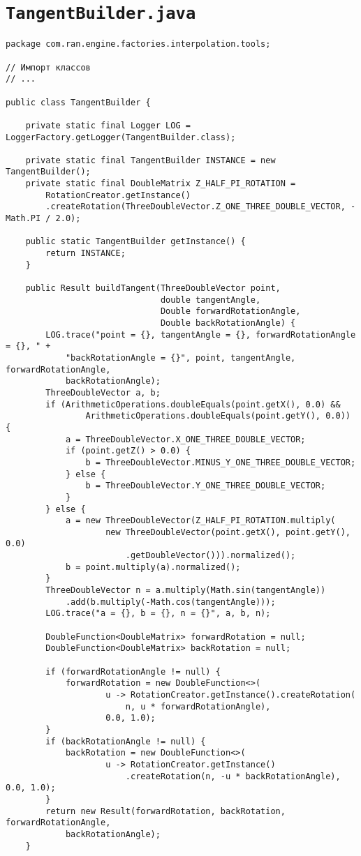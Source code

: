 \section*{\texttt{TangentBuilder.java}}
\begin{verbatim}
package com.ran.engine.factories.interpolation.tools;

// Импорт классов
// ...

public class TangentBuilder {

    private static final Logger LOG = LoggerFactory.getLogger(TangentBuilder.class);

    private static final TangentBuilder INSTANCE = new TangentBuilder();
    private static final DoubleMatrix Z_HALF_PI_ROTATION =
        RotationCreator.getInstance()
        .createRotation(ThreeDoubleVector.Z_ONE_THREE_DOUBLE_VECTOR, -Math.PI / 2.0);

    public static TangentBuilder getInstance() {
        return INSTANCE;
    }

    public Result buildTangent(ThreeDoubleVector point,
                               double tangentAngle,
                               Double forwardRotationAngle,
                               Double backRotationAngle) {
        LOG.trace("point = {}, tangentAngle = {}, forwardRotationAngle = {}, " +
            "backRotationAngle = {}", point, tangentAngle, forwardRotationAngle,
            backRotationAngle);
        ThreeDoubleVector a, b;
        if (ArithmeticOperations.doubleEquals(point.getX(), 0.0) &&
                ArithmeticOperations.doubleEquals(point.getY(), 0.0)) {
            a = ThreeDoubleVector.X_ONE_THREE_DOUBLE_VECTOR;
            if (point.getZ() > 0.0) {
                b = ThreeDoubleVector.MINUS_Y_ONE_THREE_DOUBLE_VECTOR;
            } else {
                b = ThreeDoubleVector.Y_ONE_THREE_DOUBLE_VECTOR;
            }
        } else {
            a = new ThreeDoubleVector(Z_HALF_PI_ROTATION.multiply(
                    new ThreeDoubleVector(point.getX(), point.getY(), 0.0)
                        .getDoubleVector())).normalized();
            b = point.multiply(a).normalized();
        }
        ThreeDoubleVector n = a.multiply(Math.sin(tangentAngle))
            .add(b.multiply(-Math.cos(tangentAngle)));
        LOG.trace("a = {}, b = {}, n = {}", a, b, n);

        DoubleFunction<DoubleMatrix> forwardRotation = null;
        DoubleFunction<DoubleMatrix> backRotation = null;

        if (forwardRotationAngle != null) {
            forwardRotation = new DoubleFunction<>(
                    u -> RotationCreator.getInstance().createRotation(
                        n, u * forwardRotationAngle),
                    0.0, 1.0);
        }
        if (backRotationAngle != null) {
            backRotation = new DoubleFunction<>(
                    u -> RotationCreator.getInstance()
                        .createRotation(n, -u * backRotationAngle), 0.0, 1.0);
        }
        return new Result(forwardRotation, backRotation, forwardRotationAngle,
            backRotationAngle);
    }


\end{verbatim}
